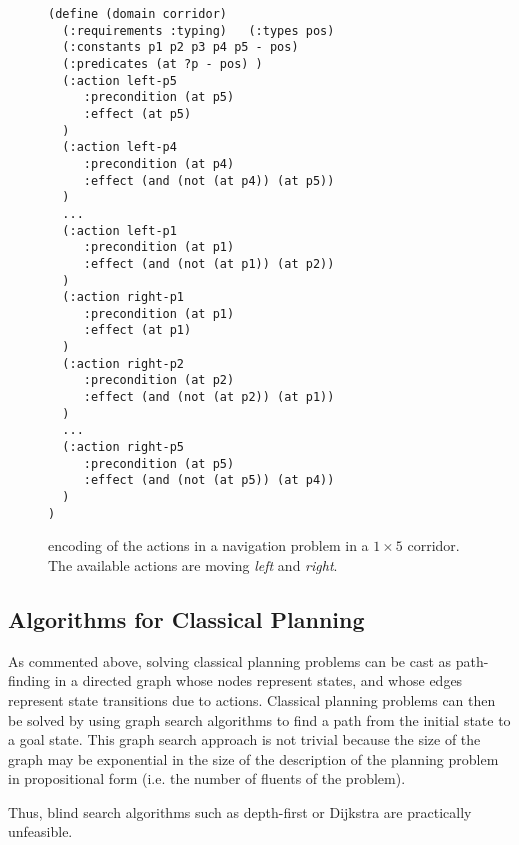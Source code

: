 \begin{figure}[p]%
 \begin{small} \centering
\begin{verbatim}(define (domain corridor)
  (:requirements :typing)   (:types pos)
  (:constants p1 p2 p3 p4 p5 - pos) 
  (:predicates (at ?p - pos) )
  (:action left-p5
     :precondition (at p5)
     :effect (at p5)
  )
  (:action left-p4
     :precondition (at p4)
     :effect (and (not (at p4)) (at p5))
  )
  ...
  (:action left-p1
     :precondition (at p1)
     :effect (and (not (at p1)) (at p2))
  )
  (:action right-p1
     :precondition (at p1)
     :effect (at p1)
  )
  (:action right-p2
     :precondition (at p2)
     :effect (and (not (at p2)) (at p1))
  )
  ...
  (:action right-p5
     :precondition (at p5)
     :effect (and (not (at p5)) (at p4))
  )
)\end{verbatim} \vspace*{-5mm}
  \caption[\pddl{} encoding of actions in a corridor navigation problem]
 {\pddl{} encoding of the actions in a navigation problem in a $1\times 5$ corridor. The available actions are moving \emph{left} and \emph{right}.
\label{fig:pddl-example-room-classical-d}}
 \end{small} 
\end{figure}







\subsection{Algorithms for Classical Planning}

As commented above, solving classical planning problems can be cast
as path-finding in a directed graph whose nodes represent states, and whose
edges represent  state transitions due to actions.  Classical
planning problems can then be solved by using graph search algorithms
to find a path from the initial state to a goal state.
%
This graph search approach is not trivial because the size of the
graph may be exponential in the size of the description of the
planning problem in propositional form (i.e. the number of fluents of
the problem).
%
\begin{comment}
  This combinatorial blow-up is due to the fact that goals (and action
  preconditions) are conjunctions of atomic facts that need to be
  achieved simultaneously.  The standard approach to deriving admi
\end{comment}
%
Thus, blind search algorithms such as depth-first or Dijkstra are
practically unfeasible. %


